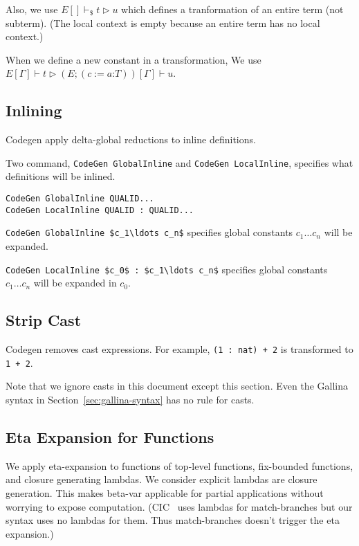 \documentclass[a4paper,fleqn]{article}
\def\gallina{\textrm{Gallina}}
\def\codegen{\textrm{Codegen}}
\newcommand{\glodef}[3]{(#1:=#2\mathord{:}#3)}
\newcommand{\secref}[1]{Section~\ref{#1}}
\newcommand{\reltri}{\mathrel{\triangleright}}
\begin{document}
Also, we use $E[] \vdash_\$ t \reltri u$ which defines a tranformation of an entire term (not subterm).
(The local context is empty because an entire term has no local context.)

When we define a new constant in a transformation,
We use $E[\Gamma] \vdash t \reltri (E;\glodef{c}{a}{T})[\Gamma] \vdash u$.

\subsection{Inlining}\label{sec:inlining}

\codegen{} apply delta-global reductions to inline definitions.

Two command, \lstinline!CodeGen GlobalInline! and \lstinline!CodeGen LocalInline!, specifies
what definitions will be inlined.
\begin{lstlisting}
CodeGen GlobalInline QUALID...
CodeGen LocalInline QUALID : QUALID...
\end{lstlisting}

\lstinline[mathescape=true]!CodeGen GlobalInline $c_1\ldots c_n$! specifies
global constants $c_1\ldots c_n$ will be expanded.

\lstinline[mathescape=true]!CodeGen LocalInline $c_0$ : $c_1\ldots c_n$! specifies
global constants $c_1\ldots c_n$ will be expanded in $c_0$.

\subsection{Strip Cast}\label{sec:strip-cast}

\codegen{} removes cast expressions.
For example, \lstinline!(1 : nat) + 2! is transformed to \lstinline!1 + 2!.

Note that we ignore casts in this document except this section.
Even the \gallina{} syntax in \secref{sec:gallina-syntax} has no rule for casts.

\subsection{Eta Expansion for Functions}\label{sec:eta-expand-funcs}
We apply eta-expansion to functions of top-level functions, fix-bounded functions, and closure generating lambdas.
We consider explicit lambdas are closure generation.
This makes beta-var applicable for partial applications without worrying to expose computation.
(CIC~\cite{coqrefman8.12.0} uses lambdas for match-branches but our syntax uses no lambdas for them.
Thus match-branches doesn't trigger the eta expansion.)
\end{document}
